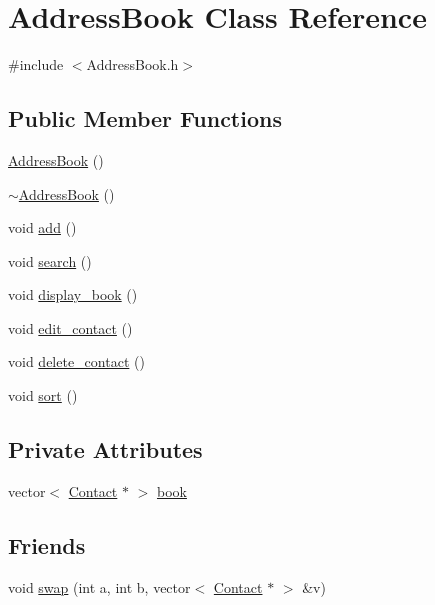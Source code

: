 \hypertarget{classAddressBook}{}\section{Address\+Book Class Reference}
\label{classAddressBook}


{\ttfamily \#include $<$Address\+Book.\+h$>$}

\subsection*{Public Member Functions}
\begin{DoxyCompactItemize}
\item 
\hyperlink{classAddressBook_ad2d2cebd2a3aa00130f769684bc8ddea}{Address\+Book} ()
\item 
\hyperlink{classAddressBook_a5638d9e7361248f33d52894f65597d47}{$\sim$\+Address\+Book} ()
\item 
void \hyperlink{classAddressBook_a55d96137f232d3a52ffb51917d31b32b}{add} ()
\item 
void \hyperlink{classAddressBook_ae4483418575343aa8d53244365a7e475}{search} ()
\item 
void \hyperlink{classAddressBook_ade80a4ffa27ed8a4f9c5c62372d34ea3}{display\+\_\+book} ()
\item 
void \hyperlink{classAddressBook_a524c975a4983e6a0b50f1e89acafa6bb}{edit\+\_\+contact} ()
\item 
void \hyperlink{classAddressBook_a96636dca787ba1a6e3d6ab7b8eb55e45}{delete\+\_\+contact} ()
\item 
void \hyperlink{classAddressBook_a7021de85815ec3aed9d2173fc15faa9b}{sort} ()
\end{DoxyCompactItemize}
\subsection*{Private Attributes}
\begin{DoxyCompactItemize}
\item 
vector$<$ \hyperlink{classContact}{Contact} $\ast$ $>$ \hyperlink{classAddressBook_a2a42a2a0314d0b2c788834caf03b452e}{book}
\end{DoxyCompactItemize}
\subsection*{Friends}
\begin{DoxyCompactItemize}
\item 
void \hyperlink{classAddressBook_ae299771d51ad4ea07d52fbfedb2d6e93}{swap} (int a, int b, vector$<$ \hyperlink{classContact}{Contact} $\ast$ $>$ \&v)
\end{DoxyCompactItemize}


